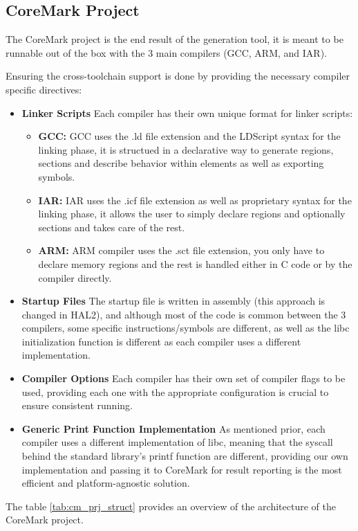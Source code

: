 \subsection{CoreMark Project}
The CoreMark project is the end result of the generation tool, it is meant to be runnable out of the box with the 3 main compilers (GCC, ARM, and IAR).

Ensuring the cross-toolchain support is done by providing the necessary compiler specific directives:
\begin{itemize}
	\item \textbf{Linker Scripts}
	Each compiler has their own unique format for linker scripts:
	\begin{itemize}
		\item \textbf{GCC:} GCC uses the .ld file extension and the LDScript syntax for the linking phase, it is structued in a declarative way to generate regions, sections and describe behavior within elements as well as exporting symbols.
		\item \textbf{IAR:} IAR uses the .icf file extension as well as proprietary syntax for the linking phase, it allows the user to simply declare regions and optionally sections and takes care of the rest.
		\item \textbf{ARM:} ARM compiler uses the .sct file extension, you only have to declare memory regions and the rest is handled either in C code or by the compiler directly.
	\end{itemize}
	\item \textbf{Startup Files} The startup file is written in assembly (this approach is changed in HAL2), and although most of the code is common between the 3 compilers, some specific instructions/symbols are different, as well as the libc initialization function is different as each compiler uses a different implementation.
	\item \textbf{Compiler Options} Each compiler has their own set of compiler flags to be used, providing each one with the appropriate configuration is crucial to ensure consistent running.
	\item \textbf{Generic Print Function Implementation} As mentioned prior, each compiler uses a different implementation of libc, meaning that the syscall behind the standard library's printf function are different, providing our own implementation and passing it to CoreMark for result reporting is the most efficient and platform-agnostic solution.
\end{itemize}
The table \ref{tab:cm_prj_struct} provides an overview of the architecture of the CoreMark project.
